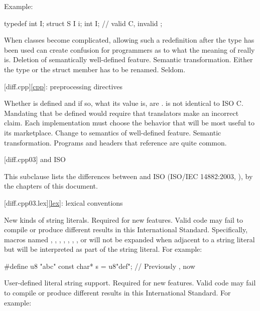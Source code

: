 Example:

\begin{codeblock}
typedef int I;
struct S {
  I i;
  int I;                  // valid C, invalid \Cpp{}
};
\end{codeblock}
\rationale
When classes become complicated, allowing such a redefinition
after the type has been used can create confusion for \Cpp{}
programmers as to what the meaning of  really is.
\effect
Deletion of semantically well-defined feature.
\difficulty
Semantic transformation.
Either the type or the struct member has to be renamed.
\howwide
Seldom.

[diff.cpp]{\ref{cpp}: preprocessing directives}

\change Whether  is defined and if so, what its value is, are
.
\rationale
\Cpp{} is not identical to ISO C\@.
Mandating that 
be defined would require that translators make an incorrect claim.
Each implementation must choose the behavior that will be most
useful to its marketplace.
\effect
Change to semantics of well-defined feature.
\difficulty
Semantic transformation.
\howwide
Programs and headers that reference  are
quite common.

[diff.cpp03]{\Cpp{} and ISO \CppIII{}}

\pnum
{}%
This subclause lists the differences between \Cpp{} and
ISO \CppIII{} (ISO/IEC 14882:2003, ),
by the chapters of this document.

[diff.cpp03.lex]{\ref{lex}: lexical conventions}

\change New kinds of string literals.
\rationale Required for new features.
\effect
Valid \CppIII{} code may fail to compile or produce different results in
this International Standard. Specifically, macros named , ,
, , , , , or  will
not be expanded when adjacent to a string literal but will be interpreted as
part of the string literal. For example:

\begin{codeblock}
#define u8 "abc"
const char* s = u8"def";        // Previously , now 
\end{codeblock}

\change User-defined literal string support.
\rationale Required for new features.
\effect
Valid \CppIII{} code may fail to compile or produce different results in
this International Standard.
For example:

